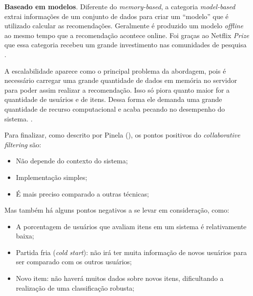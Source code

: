 
\textbf{Baseado em modelos}. Diferente do \textit{memory-based}, a categoria \textit{model-based} extrai informações de um conjunto de dados para criar um “modelo” que é utilizado calcular as recomendações. Geralmente é produzido um modelo \textit{offline} ao mesmo tempo que a recomendação acontece online. Foi graças ao Netflix \textit{Prize} que essa categoria recebeu um grande investimento nas comunidades de pesquisa \cite{Levinas2014AnAO}.

A escalabilidade aparece como o principal problema da abordagem, pois é necessário carregar uma grande quantidade de dados em memória no servidor para poder assim realizar a recomendação. Isso só piora quanto maior for a quantidade de usuários e de itens. Dessa forma ele demanda uma grande quantidade de recurso computacional e acaba pecando no desempenho do sistema. \cite{Grover:2017}.

Para finalizar, como descrito por Pinela (\citeyear{Pinela:2017}), os pontos positivos do \textit{collaborative filtering} são:

\begin{itemize}
    \item Não depende do contexto do sistema;
    
    \item Implementação simples;
    
    \item É mais preciso comparado a outras técnicas;
\end{itemize}

Mas também há alguns pontos negativos a se levar em consideração, como:

\begin{itemize}
    \item A porcentagem de usuários que avaliam itens em um sistema é relativamente baixa;
    
    \item Partida fria (\textit{cold start}): não irá ter muita informação de novos usuários para ser comparado com os outros usuários;
    
    \item Novo item: não haverá muitos dados sobre novos itens, dificultando a realização de uma classificação robusta;
\end{itemize}

